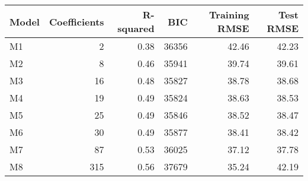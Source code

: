 \begin{tabular}{lrrrrr}
  \toprule
Model & Coefficients & R-squared & BIC & Training RMSE & Test RMSE \\ 
  \midrule
 M1 & 2 & 0.38 & 36356 & 42.46 & 42.23 \\ 
  M2 & 8 & 0.46 & 35941 & 39.74 & 39.61 \\ 
  M3 & 16 & 0.48 & 35827 & 38.78 & 38.68 \\ 
  M4 & 19 & 0.49 & 35824 & 38.63 & 38.53 \\ 
  M5 & 25 & 0.49 & 35846 & 38.52 & 38.47 \\ 
  M6 & 30 & 0.49 & 35877 & 38.41 & 38.42 \\ 
  M7 & 87 & 0.53 & 36025 & 37.12 & 37.78 \\ 
  M8 & 315 & 0.56 & 37679 & 35.24 & 42.19 \\ 
   \bottomrule
\end{tabular}
